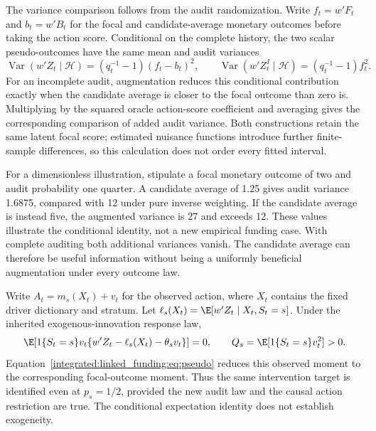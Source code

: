 The variance comparison follows from the audit randomization. Write
$f_t=w'F_t$ and $b_t=w'B_t$ for the focal and candidate-average monetary
outcomes before taking the action score. Conditional on the complete history,
the two scalar pseudo-outcomes have the same mean and audit variances
\begin{equation}\label{rel81:audit-augmentation}
 \operatorname{Var}(w'Z_t\mid\mathcal H)
   =(q_t^{-1}-1)(f_t-b_t)^2,\qquad
 \operatorname{Var}(w'Z_t^I\mid\mathcal H)
   =(q_t^{-1}-1)f_t^2.
\end{equation}
For an incomplete audit, augmentation reduces this conditional contribution
exactly when the candidate average is closer to the focal outcome than zero
is. Multiplying by the squared oracle action-score coefficient and averaging
gives the corresponding comparison of added audit variance. Both constructions
retain the same latent focal score; estimated nuisance functions introduce
further finite-sample differences, so this calculation does not order every
fitted interval.

For a dimensionless illustration, stipulate a focal monetary outcome of two
and audit probability one quarter. A candidate average of 1.25 gives audit
variance 1.6875, compared with 12 under pure inverse weighting. If the candidate
average is instead five, the augmented variance is 27 and exceeds 12. These
values illustrate the conditional identity, not a new empirical funding case.
With complete auditing both additional variances vanish. The candidate average
can therefore be useful information without being a uniformly beneficial
augmentation under every outcome law.


Write $A_t=m_s(X_t)+v_t$ for the observed action, where $X_t$ contains the
fixed driver dictionary and stratum. Let
$\ell_s(X_t)=\E[w'Z_t\mid X_t,S_t=s]$.
Under the inherited exogenous-innovation response law,
\begin{equation}
 \E\!\left[1\{S_t=s\}v_t
   \{w'Z_t-\ell_s(X_t)-\theta_sv_t\}\right]=0,
 \qquad Q_s=\E[1\{S_t=s\}v_t^2]>0.\label{integrated:linked_funding:eq:score}
\end{equation}
Equation~\eqref{integrated:linked_funding:eq:pseudo} reduces this observed moment to the corresponding
focal-outcome moment. Thus the same intervention target is identified even
at $p_s=1/2$, provided the new audit law and the causal action restriction
are true. The conditional expectation identity does not establish exogeneity.

